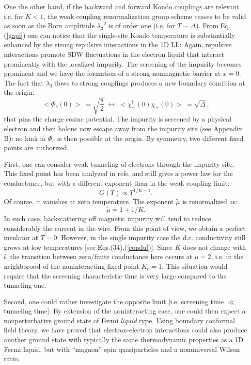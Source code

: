 One the other hand, if the backward and forward Kondo couplings are relevant
i.e. for $K<1$,
the weak coupling renormalization
group scheme ceases to be valid as soon as the Born amplitude 
${\lambda_3}^2$ is of order one (i.e. for
$T\sim\Delta$).  From
Eq.(\ref{gapi}) one can notice that the single-site Kondo temperature is
substantially enhanced by the strong repulsive interactions in the 1D
LL: Again, repulsive interactions promote SDW fluctuations in the electron
liquid that interact prominently with the localized impurity.
 The screening of the
impurity becomes prominent and we have the formation
of a strong nonmagnetic barrier at $x=0$. The fact that $\lambda_3$ flows
to strong couplings produces a new boundary condition at the origin:
\begin{equation}
<\Phi_c(0)>\ =\sqrt{\frac{\pi}{2}}\ \leftrightarrow\  
<\chi^{\dag}_-(0)\chi_+(0)>\ =\sqrt{\Delta},
\end{equation}
that pins the charge
cosine potential. The impurity is screened by a physical electron
and then holons now escape away from the impurity site (see
Appendix B): no kink
in $\Phi_c$ is then possible at the origin. By symmetry, two
different fixed points are authorized. 

First, one can consider weak
tunneling of electrons
through the impurity site. This fixed point has been analyzed in
refs.\cite{Furusaki,KLH} 
and still gives a power law for the conductance, but
with a different exponent than in the weak coupling limit:
\begin{equation}
\label{condu}
G(T)\propto T^{1/K-1}.
\end{equation}
Of course, it vanishes at zero temperature. The exponent $\tilde{\mu}$
is renormalized as:
\begin{equation}
\tilde{\mu}=1+1/K.
\end{equation}
In such case, backscattering off magnetic impurity
will tend to reduce considerably the current in the wire. From this point
of view, we obtain a perfect insulator at $T=0$: 
However, in the single impurity case
the d.c. conductivity still grows at low temperatures 
[see Eqs.(34),(\ref{condu})]. Since $K$ does not
change with $l$, the transition between zero/finite conductance here occurs
at $\tilde{\mu}=2$, i.e. in the neighborood of the noninteracting fixed
point $K_c=1$. This situation would require that the screening characteristic
time is very large compared to the tunneling one.

Second, one could rather investigate the opposite limit [i.e. screening
time $\ll$ tunneling time]. 
By extension of the noninteracting case, one could then expect
a nonperturbative ground state of Fermi {\it liquid} type. 
Using boundary conformal
field theory, we have proved that electron-electron interactions could
also produce
another ground state with typically
the same thermodynamic properties as a 1D Fermi
liquid, but with ``magnon'' spin quasiparticles and 
a nonuniversal Wilson ratio\cite{KLH}.

